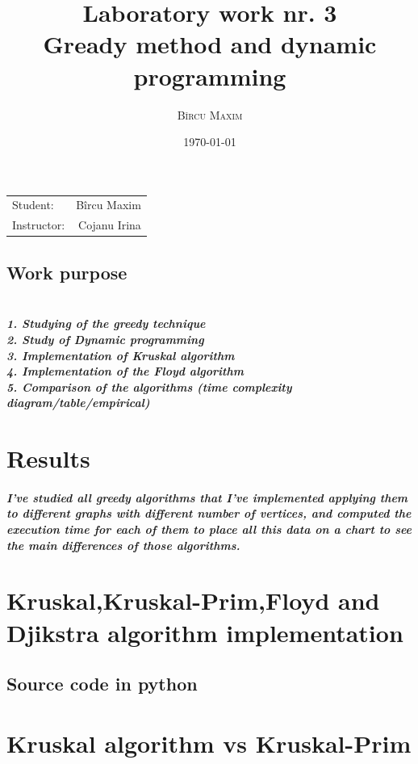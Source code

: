 \documentclass[12pt]{article}
\title{Laboratory work nr. 3  \\Gready method and dynamic programming\\ } %
\author{\textsc{Bîrcu} \textsc{Maxim}} %
\date{\today} %
\begin{document}
\maketitle %

\begin{center}
\begin{tabular}{l r}

Student: & Bîrcu Maxim \\ %
Instructor: & Cojanu Irina %

\end{tabular}
\end{center}


\subsection*{Work purpose}
\subparagraph*{
\\1. Studying of the greedy technique  \\
2. Study of Dynamic programming\\
3. Implementation of Kruskal algorithm \\
4. Implementation of the Floyd algorithm\\
5. Comparison of the algorithms (time complexity diagram/table/empirical)}

\newpage
\section*{Results}

\subparagraph*{I've studied all greedy algorithms that I've implemented applying them to different graphs with different number of vertices, and computed the execution time for each of them to place all this data on a chart to see the main differences of those algorithms.
}

\section{Kruskal,Kruskal-Prim,Floyd and Djikstra algorithm implementation}

\subsection*{Source code in python}



\section{Kruskal algorithm vs Kruskal-Prim}
\end{document}
